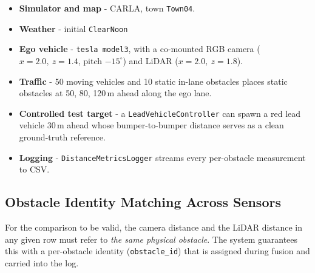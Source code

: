 \documentclass[12pt, a4paper]{report}
\begin{document}
\begin{itemize}
    \item \textbf{Simulator and map} - CARLA, town \texttt{Town04}.
    \item \textbf{Weather} - initial \texttt{ClearNoon}
    \item \textbf{Ego vehicle} - \texttt{tesla model3}, with a
    co-mounted RGB camera ($x=2.0,\ z=1.4$, pitch $-15^\circ$) and LiDAR
    ($x=2.0,\ z=1.8$).
    \item \textbf{Traffic} - 50 moving
    vehicles and 10 static in-lane obstacles
    places static obstacles at 50, 80, 120\,m
    ahead along the ego lane.
    \item \textbf{Controlled test target} - a \texttt{LeadVehicleController}
    can spawn a red lead vehicle 30\,m ahead  whose
    bumper-to-bumper distance serves as a clean ground-truth reference.
    \item \textbf{Logging} - \texttt{DistanceMetricsLogger} streams every
    per-obstacle measurement to CSV.
\end{itemize}

\subsection{Obstacle Identity Matching Across Sensors}
\label{sec:objid}

For the comparison to be valid, the camera distance and the LiDAR distance in
any given row must refer to \emph{the same physical obstacle}. The system
guarantees this with a per-obstacle identity (\texttt{obstacle\_id}) that is
assigned during fusion and carried into the log.
\end{document}
